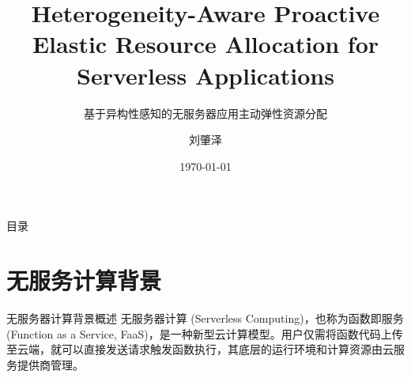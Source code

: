 \documentclass[aspectratio=169]{beamer}
\title{Heterogeneity-Aware Proactive Elastic Resource Allocation for Serverless Applications}
\subtitle{基于异构性感知的无服务器应用主动弹性资源分配}
\author{刘肇泽}
\institute{Distributed System Group, NCEPU}
\date{\today}
\begin{document}
\begin{frame}[noframenumbering]

  \titlepage

\end{frame}

\begin{frame}{目录}

  \centering
  \begin{minipage}{0.5\textwidth}
    \tableofcontents
  \end{minipage}

\end{frame}


\section{无服务计算背景}

\begin{frame}{无服务器计算背景}{概述}
  无服务器计算 (Serverless Computing)，也称为函数即服务 (Function as a Service, FaaS)，是一种新型云计算模型。用户仅需将函数代码上传至云端，就可以直接发送请求触发函数执行，其底层的运行环境和计算资源由云服务提供商管理。
\end{frame}
\end{document}
